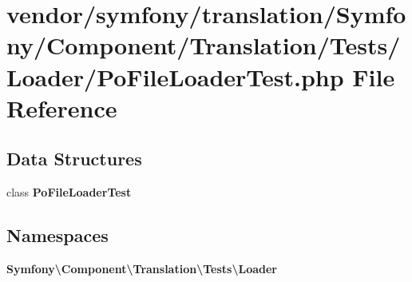 \section{vendor/symfony/translation/\+Symfony/\+Component/\+Translation/\+Tests/\+Loader/\+Po\+File\+Loader\+Test.php File Reference}
\label{_po_file_loader_test_8php}
\subsection*{Data Structures}
\begin{DoxyCompactItemize}
\item 
class {\bf Po\+File\+Loader\+Test}
\end{DoxyCompactItemize}
\subsection*{Namespaces}
\begin{DoxyCompactItemize}
\item 
 {\bf Symfony\textbackslash{}\+Component\textbackslash{}\+Translation\textbackslash{}\+Tests\textbackslash{}\+Loader}
\end{DoxyCompactItemize}
